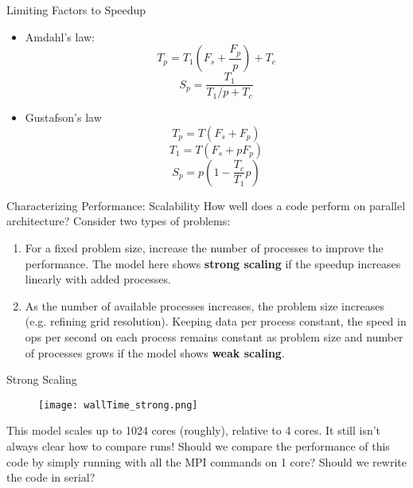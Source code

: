 \documentclass[pdf]{beamer}
\begin{document}
 \begin{frame}{Limiting Factors to Speedup}
  \begin{itemize}
	\item Amdahl's law: 
		\begin{equation}
			T_p = T_1(F_s + \frac{F_p}{p}) + T_c
		\end{equation}
		\begin{equation}
			S_p = \frac{T_1}{T_1/p + T_c}
		\end{equation}
	\item Gustafson's law
		\begin{equation}
			T_p = T(F_s + F_p)		
		\end{equation}
		\begin{equation}
			T_1 = T(F_s + pF_p)		
		\end{equation}
		\begin{equation}
			S_p = p(1 - \frac{T_c}{T_1}p)		
		\end{equation}
		
  \end{itemize} 
 \end{frame}

 \begin{frame}{Characterizing Performance: Scalability}
	How well does a code perform on parallel architecture? Consider two types of problems:
  \begin{enumerate}
	\item For a fixed problem size, increase the number of processes to improve the performance. The model here shows \textbf{strong scaling} if the speedup increases linearly with added processes. 
	\item As the number of available processes increases, the problem size increases (e.g. refining grid resolution). Keeping data per process constant, the speed in ops per second on each process remains constant as problem size and number of processes grows if the model shows \textbf{weak scaling}.
  \end{enumerate}
 \end{frame}

 \begin{frame}{Strong Scaling}

	\begin{figure}
	\centering
	\texttt{[image: wallTime\_strong.png]}
	\end{figure}

   This model scales up to 1024 cores (roughly), relative to 4 cores.
   It still isn't always clear how to compare runs! Should we compare the performance of this code by simply running with all the MPI commands on 1 core? Should we rewrite the code in serial? 
 \end{frame}
\end{document}
